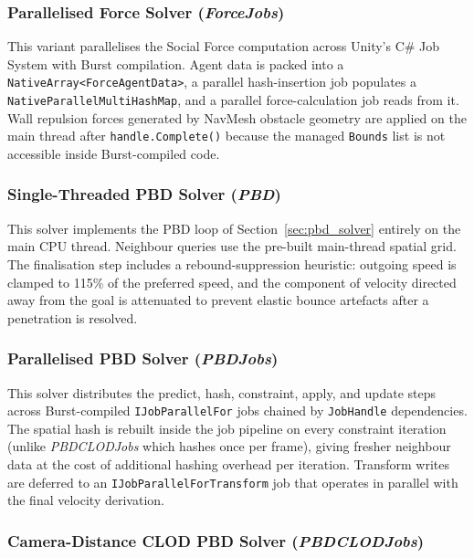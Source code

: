 \subsubsection{Parallelised Force Solver (\textit{ForceJobs})}

This variant parallelises the Social Force computation across Unity's C\# Job
System with Burst compilation.  Agent data is packed into a
\texttt{NativeArray<ForceAgentData>}, a parallel hash-insertion job populates
a \texttt{NativeParallelMultiHashMap}, and a parallel force-calculation job
reads from it.  Wall repulsion forces generated by NavMesh obstacle geometry
are applied on the main thread after \texttt{handle.Complete()} because the
managed \texttt{Bounds} list is not accessible inside Burst-compiled code.

\subsubsection{Single-Threaded PBD Solver (\textit{PBD})}

This solver implements the PBD loop of Section~\ref{sec:pbd_solver} entirely
on the main CPU thread.  Neighbour queries use the pre-built main-thread
spatial grid.  The finalisation step includes a rebound-suppression heuristic:
outgoing speed is clamped to 115\% of the preferred speed, and the component
of velocity directed away from the goal is attenuated to prevent elastic
bounce artefacts after a penetration is resolved.

\subsubsection{Parallelised PBD Solver (\textit{PBDJobs})}

This solver distributes the predict, hash, constraint, apply, and update steps
across Burst-compiled \texttt{IJobParallelFor} jobs chained by
\texttt{JobHandle} dependencies.  The spatial hash is rebuilt inside the job
pipeline on every constraint iteration (unlike \textit{PBDCLODJobs} which
hashes once per frame), giving fresher neighbour data at the cost of
additional hashing overhead per iteration.  Transform writes are deferred to
an \texttt{IJobParallelForTransform} job that operates in parallel with the
final velocity derivation.

\subsubsection{Camera-Distance CLOD PBD Solver (\textit{PBDCLODJobs})}

